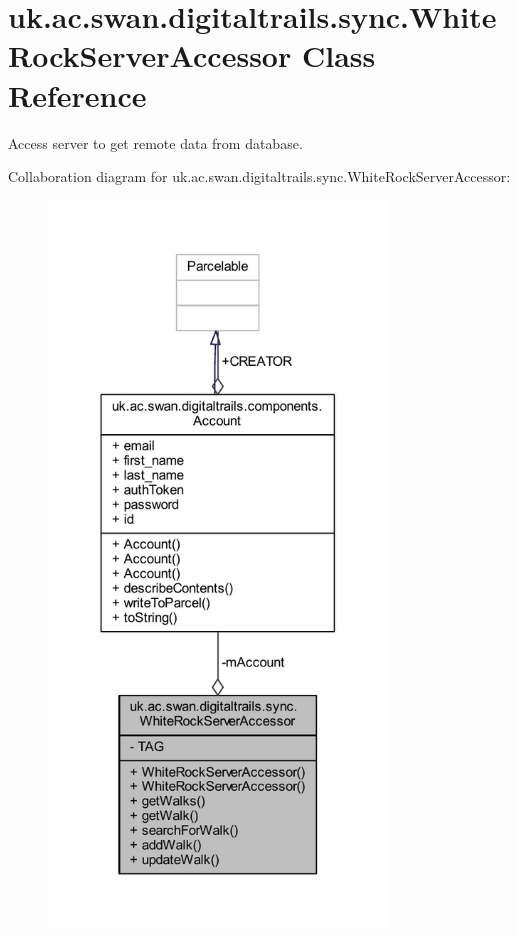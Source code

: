 \hypertarget{classuk_1_1ac_1_1swan_1_1digitaltrails_1_1sync_1_1_white_rock_server_accessor}{\section{uk.\+ac.\+swan.\+digitaltrails.\+sync.\+White\+Rock\+Server\+Accessor Class Reference}
\label{classuk_1_1ac_1_1swan_1_1digitaltrails_1_1sync_1_1_white_rock_server_accessor}
}


Access server to get remote data from database.  




Collaboration diagram for uk.\+ac.\+swan.\+digitaltrails.\+sync.\+White\+Rock\+Server\+Accessor\+:
\nopagebreak
\begin{figure}[H]
\begin{center}
\leavevmode
\includegraphics[width=255pt]{classuk_1_1ac_1_1swan_1_1digitaltrails_1_1sync_1_1_white_rock_server_accessor__coll__graph}
\end{center}
\end{figure}

